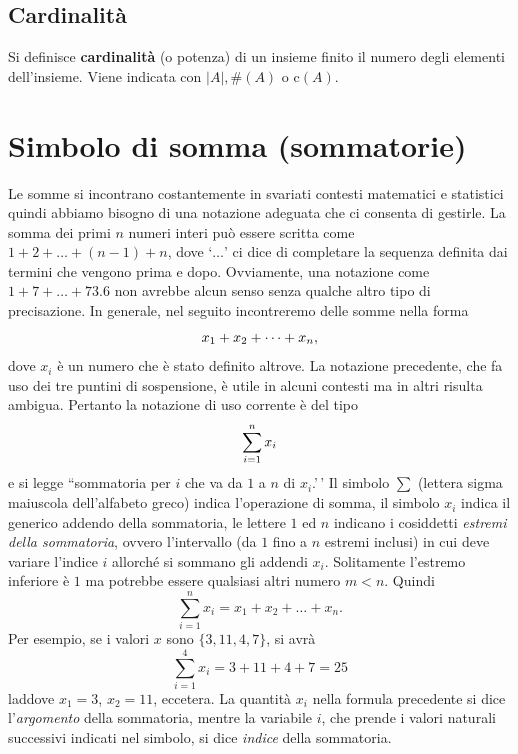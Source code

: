 \documentclass[
]{memoir}
\theoremstyle{definition}
\theoremstyle{definition}
\theoremstyle{definition}
\theoremstyle{definition}
\theoremstyle{remark}
\begin{document}
\hypertarget{cardinalituxe0}{%
\section{Cardinalità}\label{cardinalituxe0}}

Si definisce \textbf{cardinalità} (o potenza) di un insieme finito il numero
degli elementi dell'insieme. Viene indicata con \(\vert A\vert, \#(A)\) o
\(\text{c}(A)\).

\hypertarget{sommatorie}{%
\chapter{Simbolo di somma (sommatorie)}\label{sommatorie}}

Le somme si incontrano costantemente in svariati contesti matematici e statistici quindi abbiamo bisogno di una notazione adeguata che ci consenta di gestirle. La somma dei primi \(n\) numeri interi può essere scritta come \(1+2+\dots+(n-1)+n\), dove `\(\dots\)' ci dice di completare la sequenza definita dai termini che vengono prima e dopo. Ovviamente, una notazione come \(1+7+\dots+73.6\) non avrebbe alcun senso senza qualche altro tipo di precisazione. In generale, nel seguito incontreremo delle somme nella forma
\begin{equation}
x_1+x_2+\dots+x_n,\notag
\end{equation}
dove \(x_i\) è un numero che è stato definito altrove. La notazione precedente, che fa uso dei tre puntini di sospensione, è utile in alcuni contesti ma in altri risulta ambigua. Pertanto la notazione di uso corrente è del tipo
\begin{equation}
  \sum_{i=1}^n x_i\notag
\end{equation}
\noindent
e si legge ``sommatoria per \(i\) che va da \(1\) a \(n\) di \(x_i\).'\,' Il simbolo \(\sum\) (lettera sigma maiuscola dell'alfabeto greco) indica l'operazione di somma, il simbolo \(x_i\) indica il generico addendo della sommatoria, le lettere \(1\) ed \(n\) indicano i cosiddetti \emph{estremi della sommatoria}, ovvero l'intervallo (da \(1\) fino a \(n\) estremi inclusi) in cui deve variare l'indice \(i\) allorché si sommano gli addendi \(x_i\).
Solitamente l'estremo inferiore è \(1\) ma potrebbe essere qualsiasi altri numero \(m < n\). Quindi
\[
  \sum_{i=1}^n x_i = x_1 + x_{2} + \dots + x_{n}.
\]
Per esempio, se i valori \(x\) sono \(\{3, 11, 4, 7\}\), si avrà
\[
  \sum_{i=1}^4 x_i = 3+11+4+7 = 25 
\]
laddove \(x_1 = 3\), \(x_2 = 11\), eccetera. La quantità \(x_i\) nella formula precedente si dice l'\emph{argomento} della sommatoria, mentre la variabile \(i\), che prende i valori naturali successivi indicati nel simbolo, si dice \emph{indice} della sommatoria.
\end{document}
